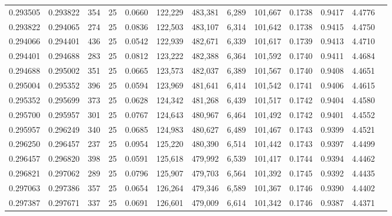 \begin{tabular}{rrrrrrrrrrrrr}
0.293505 & 0.293822 &   354 &  25 &                                     0.0660 & 122,229 & 483,381 &   6,289 & 101,667 & 0.1738 & 0.9417 & 4.4776 \\
0.293822 & 0.294065 &   274 &  25 &                                     0.0836 & 122,503 & 483,107 &   6,314 & 101,642 & 0.1738 & 0.9415 & 4.4750 \\
0.294066 & 0.294401 &   436 &  25 &                                     0.0542 & 122,939 & 482,671 &   6,339 & 101,617 & 0.1739 & 0.9413 & 4.4710 \\
0.294401 & 0.294688 &   283 &  25 &                                     0.0812 & 123,222 & 482,388 &   6,364 & 101,592 & 0.1740 & 0.9411 & 4.4684 \\
0.294688 & 0.295002 &   351 &  25 &                                     0.0665 & 123,573 & 482,037 &   6,389 & 101,567 & 0.1740 & 0.9408 & 4.4651 \\
0.295004 & 0.295352 &   396 &  25 &                                     0.0594 & 123,969 & 481,641 &   6,414 & 101,542 & 0.1741 & 0.9406 & 4.4615 \\
0.295352 & 0.295699 &   373 &  25 &                                     0.0628 & 124,342 & 481,268 &   6,439 & 101,517 & 0.1742 & 0.9404 & 4.4580 \\
0.295700 & 0.295957 &   301 &  25 &                                     0.0767 & 124,643 & 480,967 &   6,464 & 101,492 & 0.1742 & 0.9401 & 4.4552 \\
0.295957 & 0.296249 &   340 &  25 &                                     0.0685 & 124,983 & 480,627 &   6,489 & 101,467 & 0.1743 & 0.9399 & 4.4521 \\
0.296250 & 0.296457 &   237 &  25 &                                     0.0954 & 125,220 & 480,390 &   6,514 & 101,442 & 0.1743 & 0.9397 & 4.4499 \\
0.296457 & 0.296820 &   398 &  25 &                                     0.0591 & 125,618 & 479,992 &   6,539 & 101,417 & 0.1744 & 0.9394 & 4.4462 \\
0.296821 & 0.297062 &   289 &  25 &                                     0.0796 & 125,907 & 479,703 &   6,564 & 101,392 & 0.1745 & 0.9392 & 4.4435 \\
0.297063 & 0.297386 &   357 &  25 &                                     0.0654 & 126,264 & 479,346 &   6,589 & 101,367 & 0.1746 & 0.9390 & 4.4402 \\
0.297387 & 0.297671 &   337 &  25 &                                     0.0691 & 126,601 & 479,009 &   6,614 & 101,342 & 0.1746 & 0.9387 & 4.4371 \\

\end{tabular}
